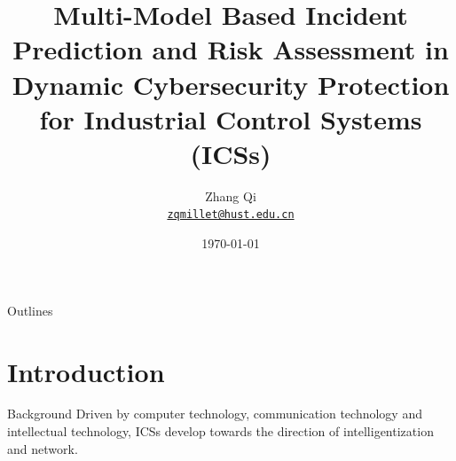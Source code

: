 \documentclass[10pt, compress]{beamer}
\title{Multi-Model Based Incident Prediction and Risk Assessment in Dynamic Cybersecurity Protection for Industrial Control Systems (ICSs)}
\subtitle{}
\date{\today}
\author[Zhang Qi] %
{
  Zhang Qi\\
  \href{mailto:qiqi@hust.edu.cn}{{\tt zqmillet@hust.edu.cn}}
}
\institute{Automation School,\\Huazhong University of Science and Technology,\\Wuhan.}
\begin{document}
\maketitle

\begin{frame}[noframenumbering]{Outlines}
    \tableofcontents %
\end{frame}

\section{Introduction}
\begin{frame}{Background}
    Driven by computer technology, communication technology and intellectual technology, ICSs develop towards the direction of intelligentization and network.
    \begin{center}
        
    \end{center}
\end{frame}
\end{document}
